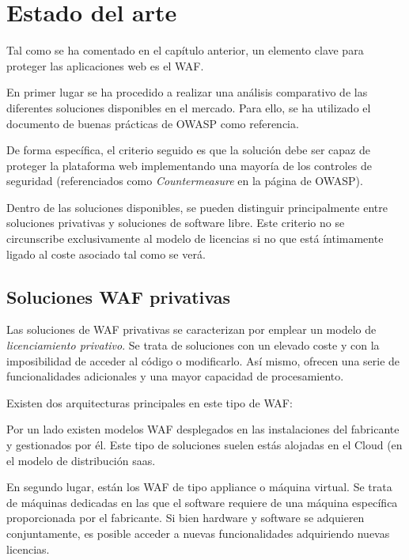 \chapter{Estado del arte}
\label{subsec:estadoarte}
\par Tal como se ha comentado en el capítulo anterior, un elemento clave para proteger las aplicaciones web es el WAF.

\par En primer lugar se ha procedido a realizar una análisis comparativo de las diferentes soluciones disponibles en el mercado. Para ello, se ha utilizado el documento de buenas prácticas de OWASP\cite{owaspbestpractices} como referencia.
\par De forma específica, el criterio seguido es que la solución debe ser capaz de proteger la plataforma web implementando una mayoría de los controles de seguridad (referenciados como {\em Countermeasure} en la página de OWASP\cite[apartado
A3.2]{owaspbestpractices}).

\par Dentro de las soluciones disponibles, se pueden distinguir principalmente entre soluciones privativas y soluciones de software libre. Este
criterio no se circunscribe exclusivamente al modelo de licencias si no que está íntimamente ligado al coste asociado tal como se verá.

\section{Soluciones WAF privativas}
\par Las soluciones de WAF privativas se caracterizan por emplear un modelo de {\em licenciamiento privativo\cite{privativo}}. Se trata de
soluciones con un elevado coste y con la imposibilidad de acceder al código o modificarlo. Así mismo, ofrecen una serie de funcionalidades
adicionales y una mayor capacidad de procesamiento.
\par Existen dos arquitecturas principales en este tipo de WAF:
\par Por un lado existen modelos WAF desplegados en las instalaciones del fabricante y gestionados por él. Este tipo de soluciones suelen estás
alojadas en el Cloud (en el modelo de distribución \acrshort{saas}.
\par En segundo lugar, están los WAF de tipo appliance o máquina virtual. Se trata de máquinas dedicadas en las que el software requiere de una
máquina específica proporcionada por el fabricante. Si bien hardware y software se adquieren conjuntamente, es posible acceder a nuevas
funcionalidades adquiriendo nuevas licencias.

